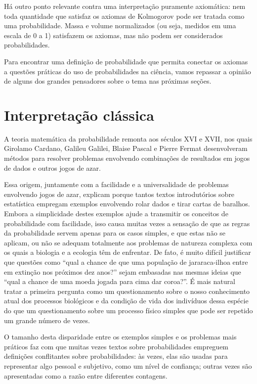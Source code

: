 Há outro ponto relevante contra uma interpretação puramente axiomática: nem toda quantidade que satisfaz
os axiomas de Kolmogorov pode ser tratada como uma probabilidade. Massa e volume normalizados (ou seja,
medidos em uma escala de 0 a 1) satisfazem os axiomas, mas não podem ser considerados probabilidades.

Para encontrar uma definição de probabilidade que permita conectar os axiomas a questões práticas do uso de probabilidades na
ciência, vamos repassar a opinião de alguns dos grandes pensadores sobre o tema nas próximas seções.

\section{Interpretação clássica}
A teoria matemática da probabilidade remonta aos séculos XVI e XVII, nos quais Girolamo Cardano, Galileu Galilei, Blaise Pascal
e Pierre Fermat desenvolveram métodos para resolver problemas envolvendo combinações de resultados em jogos de dados e outros
jogos de azar. 

Essa origem, juntamente com a facilidade e a universalidade de problemas envolvendo jogos de azar, explicam porque tantos textos
introdutórios sobre estatística empregam exemplos envolvendo rolar dados e tirar cartas de baralhos. Embora a simplicidade
destes exemplos ajude a transmitir os conceitos de probabilidade com facilidade, isso causa muitas vezes a sensação de que
as regras da probabilidade servem apenas para os casos simples, e que estas não se aplicam, ou não se adequam totalmente aos 
problemas de natureza complexa com os quais a biologia e a ecologia têm de enfrentar. De fato, é muito difícil justificar que
questões como ``qual a chance de que uma população de jararaca-ilhoa entre em extinção nos próximos dez anos?'' sejam embasadas
nas mesmas ideias que ``qual a chance de uma moeda jogada para cima dar coroa?''. É mais natural tratar a primeira pergunta como
um questionamento sobre o nosso conhecimento atual dos processos biológicos e da condição de vida dos indivíduos dessa espécie
do que um questionamento sobre um processo físico simples que pode ser repetido um grande número de vezes. 

O tamanho desta disparidade entre os exemplos simples e os problemas mais práticos faz com que muitas vezes
textos sobre probabilidades empreguem definições conflitantes sobre probabilidades: às vezes,
elas são usadas para representar algo pessoal e subjetivo, como um nível de confiança; outras vezes são apresentadas como a
razão entre diferentes contagens.

